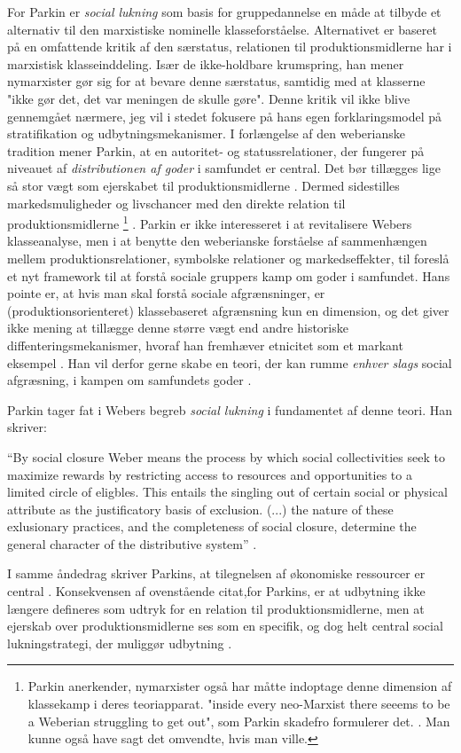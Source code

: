 For Parkin er \emph{social lukning} som basis for gruppedannelse en måde at tilbyde et alternativ til den marxistiske nominelle klasseforståelse. Alternativet er baseret på en omfattende kritik af den særstatus, relationen til produktionsmidlerne har i marxistisk klasseinddeling. Især de ikke-holdbare krumspring, han mener nymarxister gør sig for at bevare denne særstatus, samtidig med at klasserne "ikke gør det, det var meningen de skulle gøre". Denne kritik vil ikke blive gennemgået nærmere, jeg vil i stedet fokusere på hans egen forklaringsmodel på stratifikation og udbytningsmekanismer. I forlængelse af den weberianske tradition mener Parkin, at en autoritet- og statussrelationer, der fungerer på niveauet af \emph{distributionen af goder} i samfundet er central. Det bør tillægges lige så stor vægt som ejerskabet til produktionsmidlerne \parencite[24f]{Parkin1979}. Dermed sidestilles markedsmuligheder og livschancer med den direkte relation til produktionsmidlerne%
%
\footnote{Parkin anerkender, nymarxister også har måtte indoptage denne dimension af klassekamp i deres teoriapparat. "inside every neo-Marxist there seeems to be a Weberian struggling to get out", som Parkin skadefro formulerer det. \parencite[25]{Parkin1979}. Man kunne også have sagt det omvendte, hvis man ville.}%
%
. Parkin er ikke interesseret i at revitalisere Webers klasseanalyse, men i at benytte den weberianske forståelse af sammenhængen mellem produktionsrelationer, symbolske relationer og markedseffekter, til foreslå et nyt framework til at forstå sociale gruppers kamp om goder i samfundet. Hans pointe er, at hvis man skal forstå sociale afgrænsninger, er (produktionsorienteret) klassebaseret afgrænsning kun en dimension, og det giver ikke mening at tillægge denne større vægt end andre historiske diffenteringsmekanismer, hvoraf han fremhæver etnicitet som et markant eksempel \parencite[38f]{Parkin1979}. Han vil derfor gerne skabe en teori, der kan rumme \emph{enhver slags} social afgræsning, i kampen om samfundets goder \parencite[42]{Parkin1979}. 

Parkin tager fat i Webers begreb \emph{social lukning} i fundamentet af denne teori. Han skriver:
%
\begin{displayquote} “By social closure Weber means the process by which social collectivities seek to maximize rewards by restricting access to resources and opportunities to a limited circle of eligbles. This entails the singling out of certain social or physical attribute as the justificatory basis of exclusion. (...) the nature of these exlusionary practices, and the completeness of social closure, determine the general character of the distributive system” \parencite[44]{Parkin1979}. \end{displayquote}
%
I samme åndedrag skriver Parkins, at tilegnelsen af økonomiske ressourcer er central \parencite[44]{Parkin1979}. Konsekvensen af ovenstående citat,for Parkins, er at udbytning ikke længere defineres som udtryk for en relation til produktionsmidlerne, men at ejerskab over produktionsmidlerne ses som en specifik, og dog helt central social lukningstrategi, der muliggør udbytning \parencite[53]{Parkin1979}. 

